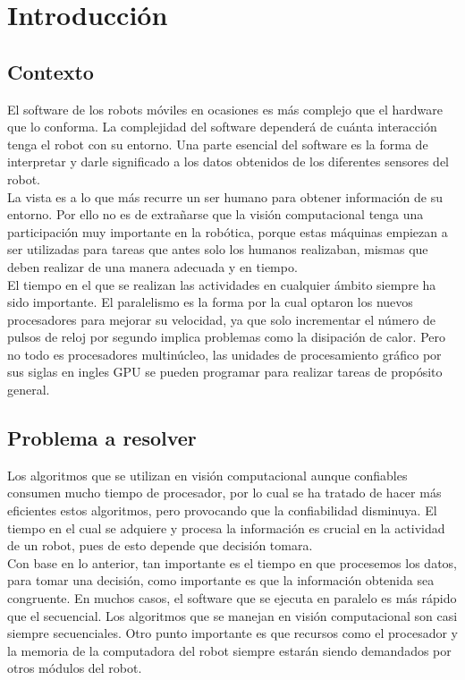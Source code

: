 \chapter{Introducción}
\section{Contexto}
El software de los robots móviles en ocasiones es más complejo que el hardware que lo conforma. La complejidad del software dependerá  de cuánta interacción tenga el robot con su entorno. Una  parte esencial del software es la forma de interpretar y darle significado a los datos obtenidos de los diferentes sensores del robot. \\
La vista es a lo que más recurre un ser humano para obtener información de su entorno. Por ello no es de extrañarse que la visión computacional tenga una participación muy importante en la robótica, porque estas máquinas empiezan a ser utilizadas para tareas que antes solo los humanos realizaban, mismas que deben realizar de una manera adecuada y en tiempo.\\
El tiempo en el que se realizan las actividades en cualquier ámbito siempre ha sido importante. El paralelismo es la forma por la cual optaron los nuevos procesadores para mejorar su velocidad, ya que solo incrementar el número de pulsos de reloj por segundo implica problemas como la disipación de calor. Pero no todo es procesadores multinúcleo, las unidades de procesamiento gráfico por sus siglas en ingles GPU se pueden programar para realizar tareas de propósito general.\\

\section{Problema a resolver}
Los algoritmos que se utilizan en visión computacional aunque confiables consumen mucho tiempo de procesador, por lo cual se ha tratado de hacer más eficientes estos algoritmos, pero provocando que  la confiabilidad disminuya. El tiempo en el cual se adquiere y procesa la información es crucial en la actividad de un robot, pues de esto depende que decisión tomara.\\
Con base en lo anterior, tan importante es el tiempo en que procesemos los datos, para tomar una decisión, como importante es que la información obtenida sea congruente. En muchos casos, el software que se ejecuta en paralelo es más rápido que el secuencial. Los algoritmos que se manejan en visión computacional son  casi siempre secuenciales. Otro punto importante es que recursos como el procesador y la memoria de la computadora del robot siempre estarán siendo demandados por otros módulos del robot.\\

